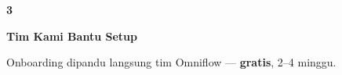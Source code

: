 \documentclass[a4paper]{article}
\begin{document}
\begin{center}
\begin{minipage}[t]{0.318\textwidth}
{\begin{minipage}[t][4.7cm][c]{\dimexpr\linewidth-2\fboxsep\relax}
            \begin{center}
                {\fontsize{22}{26}\selectfont\bfseries\color{BluePrimary} 3}
            \end{center}
            \vspace{2pt}
            \begin{center}
                {\fontsize{10}{13}\selectfont\bfseries\color{BlueDark} Tim Kami Bantu Setup}\par\vspace{3pt}
                {\fontsize{9}{12}\selectfont\color{TextDark} Onboarding dipandu langsung tim Omniflow --- \textbf{gratis}, 2--4 minggu.}
            \end{center}
        \end{minipage}}
\end{minipage}
\end{center}

\vspace{8pt}

\pagestyle{empty}
\restoregeometry
\end{document}
